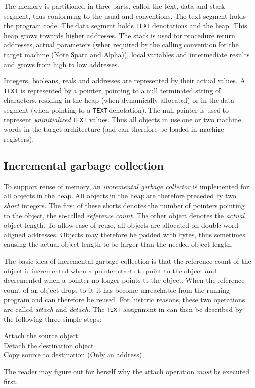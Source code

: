 \documentclass [a4paper,12pt,fleqn]{article}
\begin{document}
The memory is partitioned in three parts, called the text, data and stack
segment, thus conforming to the usual \C and \Unix conventions. The text
segment holds the program code. The data segment holds {\tt TEXT} denotations
and the heap. This heap grows towards higher addresses. The stack is used
for procedure return addresses, actual parameters (when required by the \C
calling convention for the target machine (Note Sparc and Alpha)), local
variables and intermediate results and grows from high to low addresses. 

Integers, booleans, reals and addresses are represented by their actual values.
A {\tt TEXT} is represented by a pointer, pointing to a null terminated
string of characters, residing in the heap (when dynamically allocated)
or in the data segment (when pointing to a {\tt TEXT} denotation).
The null pointer is used to represent {\em uninitialized} {\tt TEXT} values.
Thus all objects in \ELAN use one or two machine words in the target
architecture (and can therefore be loaded in machine registers).
\subsection {Incremental garbage collection}
To support reuse of memory, an {\em incremental garbage collector} is
implemented for all objects in the heap. All objects in the heap are
therefore preceded by two {\em short} integers. The first of these shorts
denotes the number of pointers pointing to the object, the so-called
{\em reference count}. The other object denotes the {\em actual} object
length. To allow ease of reuse, all objects are allocated on double word
aligned addresses. Objects may therefore be padded with bytes, thus sometimes
causing the actual object length to be larger than the needed object length.

The basic idea of incremental garbage collection is that the reference count
of the object is incremented when a pointer starts to point to the object
and decremented when a pointer no longer points to the object. When the
reference count of an object drops to 0, it has become unreachable from
the running program and can therefore be reused. For historic reasons,
these two operations are called {\em attach} and {\em detach}. The
\verb+TEXT+ assignment in \ELAN can then be described by the following
three simple steps:
\begin{tabbing}
\hspace*{2em}\=Attach the source object \\
\>Detach the destination object\\
\>Copy source to destination (Only an address)
\end{tabbing}
The reader may figure out for herself why the attach operation {\em must}
be executed first.
\end{document}
